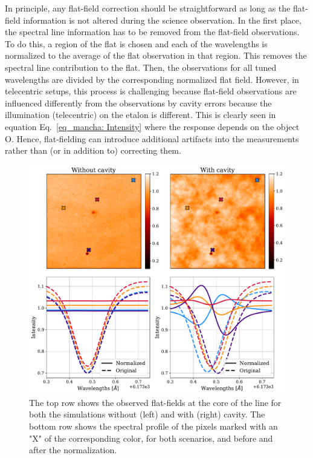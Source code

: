 In principle, any flat-field correction should be straightforward as long as the flat-field information is not altered during the science observation. In the first place, the spectral line information has to be removed from the flat-field observations. To do this, a region of the flat is chosen and each of the wavelengths is normalized to the average of the flat observation in that region. This removes the spectral line contribution to the flat. Then, the observations for all tuned wavelengths are divided by the corresponding normalized flat field. However, in telecentric setups, this process is challenging because flat-field observations are influenced differently from the observations by cavity errors because the illumination (telecentric) on the etalon is different. This is clearly seen in equation Eq.~\eqref{eq_mancha: Intensity} where the response depends on the object O. Hence, flat-fielding can introduce additional artifacts into the measurements rather than (or in addition to) correcting them.

\begin{figure}
  \begin{minipage}[c]{0.7\textwidth}
    \includegraphics[width=\textwidth]{figures/Mancha/Flat_field_normalization.pdf}
  \end{minipage}\hfill
  \begin{minipage}[c]{0.27\textwidth}
    \caption[Flat-field profiles.]{
      The top row shows the observed flat-fields at the core of the line for both the simulations without (left) and with (right) cavity. The bottom row shows the spectral profile of the pixels marked with an "X" of the corresponding color, for both scenarios, and before and after the normalization.      
    \label{fig_mancha: flat_field normalization}} 
  \end{minipage}
\end{figure}

